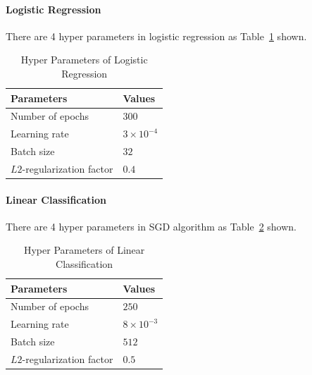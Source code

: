 \documentclass[journal, a4paper]{IEEEtran}
\begin{document}
\paragraph{Logistic Regression}
    There are 4 hyper parameters in logistic regression as Table~\ref{tab:logistic-params} shown.
    \begin{table}[!hbt]
        \begin{center}
            \caption{Hyper Parameters of Logistic Regression}
            \label{tab:logistic-params}
            \begin{tabular}{l|l}
                \hline
                Parameters & Values \\
                \hline
                Number of epochs & $300$ \\
                Learning rate & $3\times 10^{-4}$ \\
                Batch size & $32$ \\
                $L2$-regularization factor & $0.4$ \\
                \hline
            \end{tabular}
        \end{center}
    \end{table}

\paragraph{Linear Classification}
    There are 4 hyper parameters in SGD algorithm as Table~\ref{tab:linear-params} shown.
    \begin{table}[!hbt]
        \begin{center}
            \caption{Hyper Parameters of Linear Classification}
            \label{tab:linear-params}
            \begin{tabular}{l|l}
                \hline
                Parameters & Values \\
                \hline
                Number of epochs & $250$ \\
                Learning rate & $8\times 10^{-3}$ \\
                Batch size & $512$ \\
                $L2$-regularization factor & $0.5$ \\
                \hline
            \end{tabular}
        \end{center}
    \end{table}
    
\end{document}
